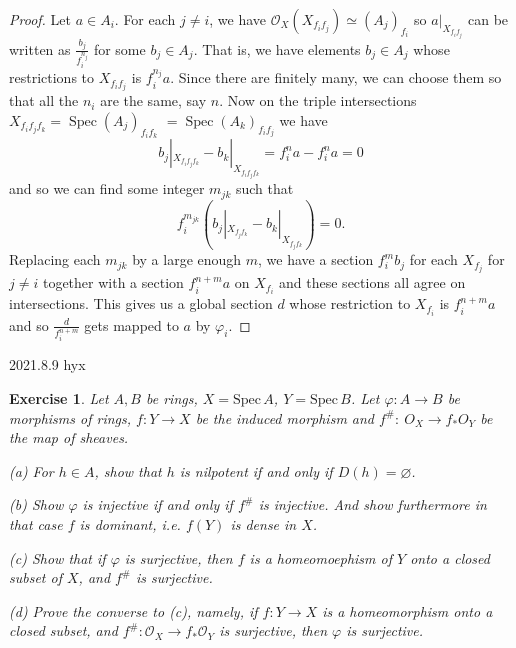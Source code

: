 \documentclass{amsart}
\newtheorem{exe}{Exercise}[subsection]
\begin{document}
\begin{proof}
Let $a \in A_{i} .$ For each $j \neq i$, we have $\mathcal{O}_{X}\left(X_{f_{i} f_{j}}\right) \simeq\left(A_{j}\right)_{f_{i}}$ so $a|_{X_{f_{i} f_{j}}}$ can be written as $\frac{b_{j}}{f_{i}^{n_{j}}}$ for some $b_{j} \in A_{j} .$ That is, we have elements $b_{j} \in A_{j}$ whose restrictions to $X_{f_{i} f_{j}}$ is $f_{i}^{n_{j}} a$. Since there are finitely many, we can choose them so that all the $n_{i}$ are the same, say $n .$ Now on the triple intersections $X_{f_{i} f_{j} f_{k}}=\operatorname{Spec}\left(A_{j}\right)_{f_{i} f_{k}}$ $=\operatorname{Spec}\left(A_{k}\right)_{f_{i} f_{j}}$ we have $$b_{j}|_{X_{f_if_jf_k}}-b_{k}|_{X_{f_if_jf_k}}=f_{i}^{n} a-f_{i}^{n} a=0$$ and so we can find some integer $m_{j k}$ such that $$f_{i}^{m_{j k}}\left(b_{j}|_{X_{f_jf_k}}-b_{k}|_{X_{f_jf_k}}\right)=0.$$ Replacing each $m_{j k}$ by a large enough $m$, we have a section $f_{i}^{m} b_{j}$ for each $X_{f_{j}}$ for $j \neq i$ together with a section $f_{i}^{n+m} a$ on $X_{f_{i}}$ and these sections all agree on intersections. This gives us a global section $d$ whose restriction to $X_{f_{i}}$ is $f_{i}^{n+m} a$ and so $\frac{d}{f_{i}^{n+m}}$ gets mapped to $a$ by $\varphi_{i}$.
\end{proof}

2021.8.9 hyx 
\begin{exe}
	\label{2.2.18}
Let $A, B$ be rings, $X=\mathrm{Spec}\,A$, $Y=\mathrm{Spec}\,B$. Let $\varphi : A\rightarrow B$ be morphisms of rings, $f: Y\rightarrow X $
be the induced morphism and $f^\#:\ O_X \rightarrow f_*O_Y$ be the map of sheaves.

(a) For $h\in A$, show that $h$ is nilpotent if and only if $D(h)=\varnothing$.

(b) Show $\varphi$ is injective if and only if $f^\#$ is injective. And show furthermore in that case $f$ is \emph{dominant}, i.e. $f(Y)$ is dense in $X$.

(c) Show that if $\varphi$ is surjective, then $f$ is a homeomoephism of $Y$ onto a closed subset of $X$, and $f^\#$ is surjective.

(d) Prove the converse to (c), namely, if $f:Y\to X$ is a homeomorphism onto a closed subset, and $f^\#:\mathcal{O}_X\to f_*\mathcal{O}_Y$ is surjective, then $\varphi$ is surjective.
\end{exe}
\end{document}
